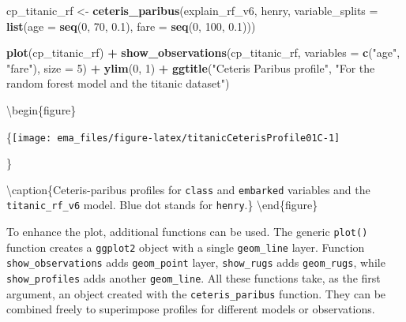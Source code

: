 \documentclass[12pt,]{krantz}
\newenvironment{Shaded}{\begin{snugshade}}{\end{snugshade}}
\newcommand{\DataTypeTok}[1]{\textcolor[rgb]{0.13,0.29,0.53}{#1}}
\newcommand{\DecValTok}[1]{\textcolor[rgb]{0.00,0.00,0.81}{#1}}
\newcommand{\FloatTok}[1]{\textcolor[rgb]{0.00,0.00,0.81}{#1}}
\newcommand{\KeywordTok}[1]{\textcolor[rgb]{0.13,0.29,0.53}{\textbf{#1}}}
\newcommand{\NormalTok}[1]{#1}
\newcommand{\OperatorTok}[1]{\textcolor[rgb]{0.81,0.36,0.00}{\textbf{#1}}}
\newcommand{\StringTok}[1]{\textcolor[rgb]{0.31,0.60,0.02}{#1}}
\begin{document}
\begin{Shaded}
\begin{Highlighting}[]
\NormalTok{cp_titanic_rf <-}\StringTok{ }\KeywordTok{ceteris_paribus}\NormalTok{(explain_rf_v6, henry,}
              \DataTypeTok{variable_splits =} \KeywordTok{list}\NormalTok{(}\DataTypeTok{age =} \KeywordTok{seq}\NormalTok{(}\DecValTok{0}\NormalTok{, }\DecValTok{70}\NormalTok{, }\FloatTok{0.1}\NormalTok{),}
                                     \DataTypeTok{fare =} \KeywordTok{seq}\NormalTok{(}\DecValTok{0}\NormalTok{, }\DecValTok{100}\NormalTok{, }\FloatTok{0.1}\NormalTok{)))}
\end{Highlighting}
\end{Shaded}

\begin{Shaded}
\begin{Highlighting}[]
\KeywordTok{plot}\NormalTok{(cp_titanic_rf) }\OperatorTok{+}\StringTok{ }
\StringTok{  }\KeywordTok{show_observations}\NormalTok{(cp_titanic_rf, }\DataTypeTok{variables =} \KeywordTok{c}\NormalTok{(}\StringTok{"age"}\NormalTok{, }\StringTok{"fare"}\NormalTok{), }\DataTypeTok{size =} \DecValTok{5}\NormalTok{) }\OperatorTok{+}\StringTok{ }
\StringTok{  }\KeywordTok{ylim}\NormalTok{(}\DecValTok{0}\NormalTok{, }\DecValTok{1}\NormalTok{) }\OperatorTok{+}
\StringTok{  }\KeywordTok{ggtitle}\NormalTok{(}\StringTok{"Ceteris Paribus profile"}\NormalTok{, }
          \StringTok{"For the random forest model and the titanic dataset"}\NormalTok{)}
\end{Highlighting}
\end{Shaded}

\textbackslash{}begin\{figure\}

\{\centering \texttt{[image: ema\_files/figure-latex/titanicCeterisProfile01C-1]}

\}

\textbackslash{}caption\{Ceteris-paribus profiles for \texttt{class} and \texttt{embarked} variables and the \texttt{titanic\_rf\_v6} model. Blue dot stands for \texttt{henry}.\}\label{fig:titanicCeterisProfile01C}
\textbackslash{}end\{figure\}

To enhance the plot, additional functions can be used. The generic \texttt{plot()} function creates a \texttt{ggplot2} object with a single \texttt{geom\_line} layer. Function \texttt{show\_observations} adds \texttt{geom\_point} layer, \texttt{show\_rugs} adds \texttt{geom\_rugs}, while \texttt{show\_profiles} adds another \texttt{geom\_line}. All these functions take, as the first argument, an object created with the \texttt{ceteris\_paribus} function. They can be combined freely to superimpose profiles for different models or observations.
\end{document}
